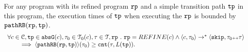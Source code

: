 \begin{lemma}
  For any program with its refined program $\mathtt{rp}$ and a simple transition path $\mathtt{tp}$ in this program,
  the execution times of $\mathtt{tp}$ when executing the $\mathtt{rp}$ is bounded by $\mathtt{pathRB}(\mathtt{rp}, \mathtt{tp})$.
  \[
    \begin{array}{l}
    \forall c \in \mathcal{C}, \mathtt{tp} \in \mathtt{abs}{\mathtt{G}}(c), \mathtt{\tau}_0 \in \mathcal{T}_0(c), \mathtt{\tau} \in \mathcal{T}, \mathtt{rp} ~.~ 
    \mathtt{rp} = REFINE(c)
    \land
    \langle c, \mathtt{\tau}_0 \rangle \to^* 
    \langle {\ensuremath{\mathtt{skip}}, \ensuremath{\mathtt{\tau}}_0 {\scriptscriptstyle ++}\ensuremath{\mathtt{\tau}}} \rangle
    \\ \qquad
    \implies
    \langle \mathtt{pathRB}(\mathtt{rp}, \mathtt{tp}) \rangle(\mathtt{\tau}_0) \geq \mathtt{cnt}(\mathtt{\tau}, L(\mathtt{tp})).
    \end{array}
    \]
\end{lemma}
%
